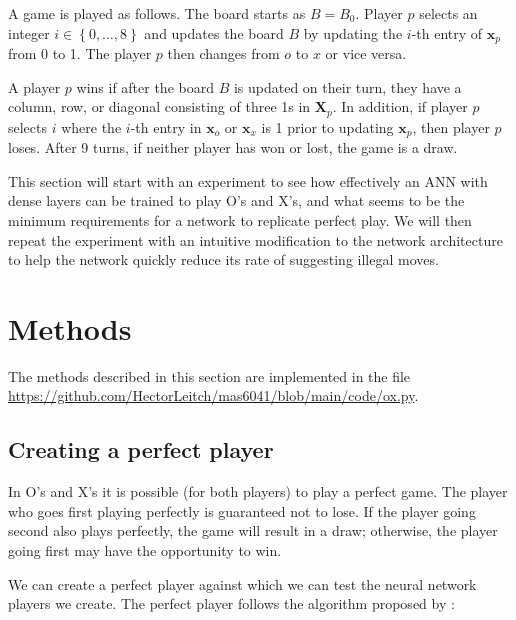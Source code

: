 \documentclass{somasmsc}
\begin{document}
A game is played as follows. The board starts as $B = B_0$. Player $p$ selects an integer $i \in \left\{0, \dots, 8\right\}$ and updates the board $B$ by updating the $i$-th entry of $\pmb{x}_p$ from 0 to 1. The player $p$ then changes from $o$ to $x$ or vice versa.

A player $p$ wins if after the board $B$ is updated on their turn, they have a column, row, or diagonal consisting of three 1s in $\mathbf{X}_p$. In addition, if player $p$ selects $i$ where the $i$-th entry in $\pmb{x}_o$ or $\pmb{x}_x$ is 1 prior to updating $\pmb{x}_p$, then player $p$ loses. After 9 turns, if neither player has won or lost, the game is a draw.

This section will start with an experiment to see how effectively an ANN with dense layers can be trained to play O's and X's, and what seems to be the minimum requirements for a network to replicate perfect play. We will then repeat the experiment with an intuitive modification to the network architecture to help the network quickly reduce its rate of suggesting illegal moves.

\section{Methods}

The methods described in this section are implemented in the file \url{https://github.com/HectorLeitch/mas6041/blob/main/code/ox.py}.

\subsection{Creating a perfect player}

In O's and X's it is possible (for both players) to play a perfect game. The player who goes first playing perfectly is guaranteed not to lose. If the player going second also plays perfectly, the game will result in a draw; otherwise, the player going first may have the opportunity to win.

We can create a perfect player against which we can test the neural network players we create. The perfect player follows the algorithm proposed by \citep{crowley1993flexible}:
\end{document}
